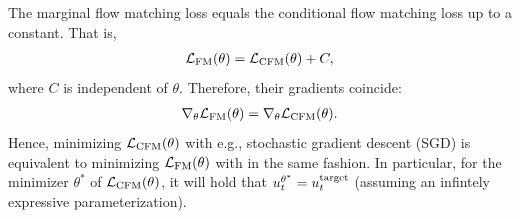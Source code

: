 \begin{theorem}
\label{thm:fm_loss} 
The marginal flow matching loss equals the conditional flow matching loss up to a constant. That is,
\begin{align*}
\mathcal{L}_{\text{FM}}(\theta) = \mathcal{L}_{\text{CFM}}(\theta) + C,
\end{align*}
where $C$ is independent of $\theta$. Therefore, their gradients coincide:
\begin{align*}
\nabla_\theta \mathcal{L}_{\text{FM}}(\theta) = \nabla_\theta \mathcal{L}_{\text{CFM}}(\theta).
\end{align*}
Hence, minimizing $\mathcal{L}_{\text{CFM}}(\theta)$ with e.g., stochastic gradient descent (SGD) is equivalent to minimizing $\mathcal{L}_{\text{FM}}(\theta)$ with in the same fashion. In particular, for the minimizer $\theta^*$ of $\mathcal{L}_{\text{CFM}}(\theta)$, it will hold that $u_t^{\theta^*}=u^{\text{target}}_t$ (assuming an infintely expressive parameterization). 
\end{theorem}
